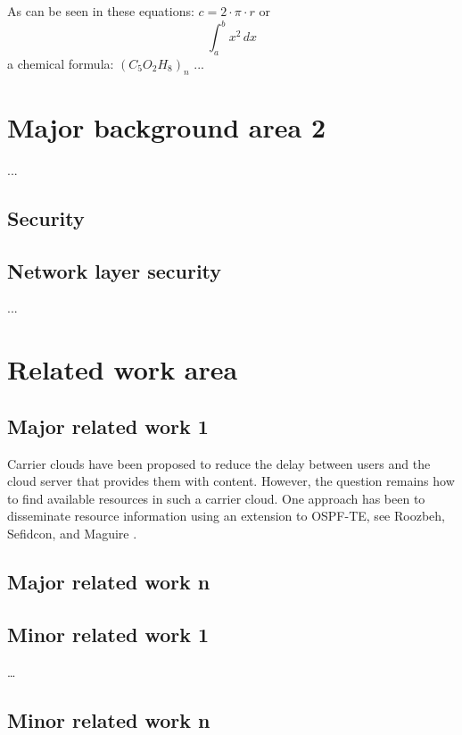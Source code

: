\documentclass[
English,                 %
includepublications,    %
%
%
%
%
%
%
%
%
%
%
%
%
%
%
%
%
%
%
]{kththesis}
\begin{document}
As can be seen in these equations:
$c=2 \cdot \pi \cdot r$ or \[ \int_{a}^{b} x^2 \,dx \] a chemical formula: $(C_5O_2H_8)_n$
...
\section{Major background area 2}
...
\subsection{ Security}%

\subsection{Network layer security}
...

\section{Related work area}


\subsection{Major related work 1}
Carrier clouds have been proposed to reduce the delay between users and the cloud server that provides them with content. However, the question remains how to find available resources in such a carrier cloud. One approach has been to disseminate resource information using an extension to OSPF-TE, see Roozbeh, Sefidcon, and Maguire \cite{roozbeh_resource_2013}.


\subsection{Major related work n}

\subsection{Minor related work 1}


…
\subsection{Minor related work n}
\end{document}
